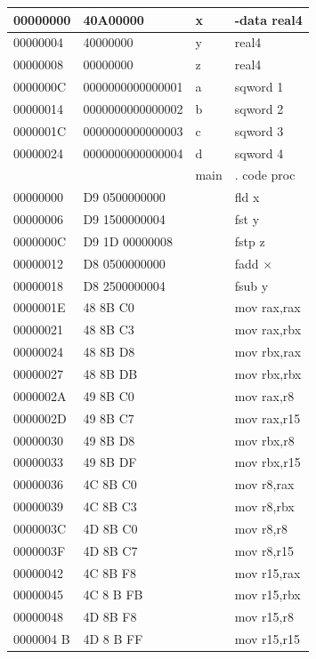 \documentclass[10pt]{book}
\begin{document}
\begin{center}
\begin{tabular}{|l|l|l|l|}
\hline
00000000 & 40A00000 & x & -data real4 \\
\hline
00000004 & 40000000 & y & real4 \\
\hline
00000008 & 00000000 & z & real4 \\
\hline
0000000C & 0000000000000001 & a & sqword 1 \\
\hline
00000014 & 0000000000000002 & b & sqword 2 \\
\hline
0000001C & 0000000000000003 & c & sqword 3 \\
\hline
00000024 & 0000000000000004 & d & sqword 4 \\
\hline
 &  & main & . code proc \\
\hline
00000000 & D9 0500000000 &  & fld x \\
\hline
00000006 & D9 1500000004 &  & fst y \\
\hline
0000000C & D9 1D 00000008 &  & fstp z \\
\hline
00000012 & D8 0500000000 &  & fadd × \\
\hline
00000018 & D8 2500000004 &  & fsub y \\
\hline
0000001E & 48 8B C0 &  & mov rax,rax \\
\hline
00000021 & 48 8B C3 &  & mov rax,rbx \\
\hline
00000024 & 48 8B D8 &  & mov rbx,rax \\
\hline
00000027 & 48 8B DB &  & mov rbx,rbx \\
\hline
0000002A & 49 8B C0 &  & mov rax,r8 \\
\hline
0000002D & 49 8B C7 &  & mov rax,r15 \\
\hline
00000030 & 49 8B D8 &  & mov rbx,r8 \\
\hline
00000033 & 49 8B DF &  & mov rbx,r15 \\
\hline
00000036 & 4C 8B C0 &  & mov r8,rax \\
\hline
00000039 & 4C 8B C3 &  & mov r8,rbx \\
\hline
0000003C & 4D 8B C0 &  & mov r8,r8 \\
\hline
0000003F & 4D 8B C7 &  & mov r8,r15 \\
\hline
00000042 & 4C 8B F8 &  & mov r15,rax \\
\hline
00000045 & 4C 8 B FB &  & mov r15,rbx \\
\hline
00000048 & 4D 8B F8 &  & mov r15,r8 \\
\hline
0000004 B & 4D 8 B FF &  & mov r15,r15 \\
\hline
\end{tabular}
\end{center}
\end{document}
